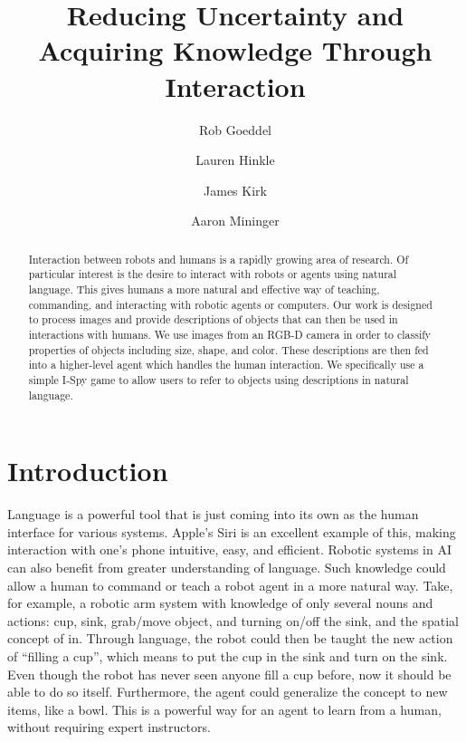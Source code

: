 \documentclass[11pt]{article}
\title{Reducing Uncertainty and Acquiring Knowledge Through Interaction}
\author{Rob Goeddel \and Lauren Hinkle \and James Kirk \and Aaron Mininger}
\date{}
\newcommand{\xxx}[1]{{\bf \color{red} #1}}
\begin{document}
\maketitle


\begin{abstract}
Interaction between robots and humans is a rapidly growing area of research.
Of particular interest is the desire to interact with robots or agents using
natural language. This gives humans a more natural and effective way of teaching,
commanding, and interacting with robotic agents or computers. Our work is
designed to process images and provide descriptions of objects that can then be
used in interactions with humans. We use images from an RGB-D camera in order to
classify properties of objects including size, shape, and color. These
descriptions are then fed into a higher-level agent which handles the human
interaction. We specifically use a simple I-Spy game to allow users to refer to
objects using descriptions in natural language.
\end{abstract}


\section{Introduction}
Language is a powerful tool that is just coming into its own as the human
interface for various systems. Apple's Siri is an excellent example of this,
making interaction with one's phone intuitive, easy, and efficient. Robotic
systems in AI can also benefit from greater understanding of language. Such
knowledge could allow a human to command or teach a robot agent in a more natural
way. Take, for example, a robotic arm system with knowledge of only several nouns
and actions: cup, sink, grab/move object, and turning on/off the sink, and the
spatial concept of in. Through language, the robot could then be taught the new
action of ``filling a cup'', which means to put the cup in the sink and turn on
the sink. Even though the robot has never seen anyone fill a cup before, now it
should be able to do so itself. Furthermore, the agent could generalize the
concept to new items, like a bowl. This is a powerful way for an agent to learn
from a human, without requiring expert instructors.
\end{document}
